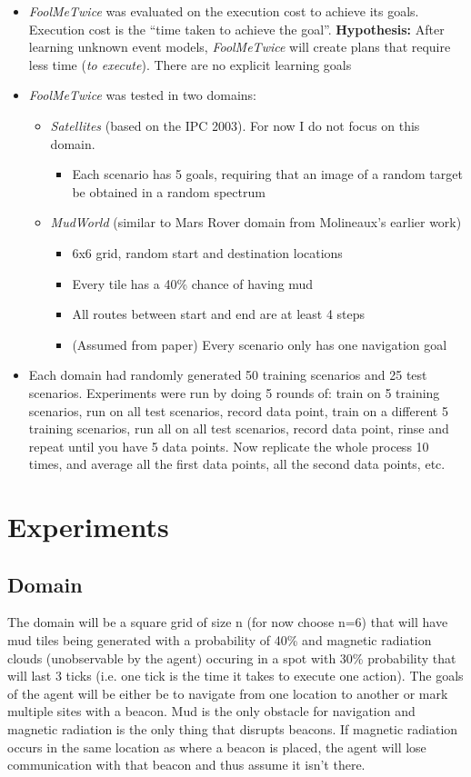 \documentclass{article}
\begin{document}
\begin{itemize}
\item \textit{FoolMeTwice} was evaluated on the execution cost to achieve its goals. Execution cost is the ``time taken to achieve the goal''. \textbf{Hypothesis:} After learning unknown event models, \textit{FoolMeTwice} will create plans that require less time (\textit{to execute}). There are no explicit learning goals  
\item \textit{FoolMeTwice} was tested in two domains:
\begin{itemize}
\item \textit{Satellites} (based on the IPC 2003). For now I do not focus on this domain.
\begin{itemize}
\item Each scenario has 5 goals, requiring that an image of a random target be obtained in a random spectrum
\end{itemize}
\item \textit{MudWorld} (similar to Mars Rover domain from Molineaux's earlier work)
\begin{itemize}
\item 6x6 grid, random start and destination locations
\item Every tile has a 40\% chance of having mud
\item All routes between start and end are at least 4 steps
\item (Assumed from paper) Every scenario only has one navigation goal
\end{itemize}
\end{itemize}
\item Each domain had randomly generated 50 training scenarios and 25 test scenarios. Experiments were run by doing 5 rounds of: train on 5 training scenarios, run on all test scenarios, record data point, train on a different 5 training scenarios, run all on all test scenarios, record data point, rinse and repeat until you have 5 data points. Now replicate the whole process 10 times, and average all the first data points, all the second data points, etc. 
\end{itemize}


\section{Experiments}
\subsection{Domain}
The domain will be a square grid of size n (for now choose n=6) that
will have mud tiles being generated with a probability of 40\% and
magnetic radiation clouds (unobservable by the agent) occuring in a
spot with 30\% probability that will last 3 ticks (i.e. one tick is
the time it takes to execute one action). The goals of the agent will
be either be to navigate from one location to another or mark multiple
sites with a beacon. Mud is the only obstacle for navigation and
magnetic radiation is the only thing that disrupts beacons. If
magnetic radiation occurs in the same location as where a beacon is
placed, the agent will lose communication with that beacon and thus
assume it isn't there.
\end{document}
